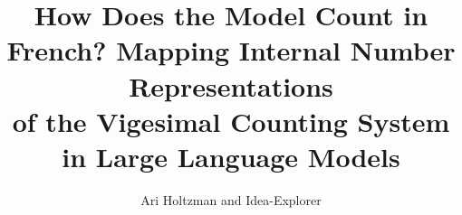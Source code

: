 \documentclass{article}
\title{How Does the Model Count in French? Mapping Internal Number Representations\\of the Vigesimal Counting System in Large Language Models}
\author{Ari Holtzman and Idea-Explorer}
\begin{document}
\maketitle

\begin{abstract}

\end{abstract}










\end{document}
